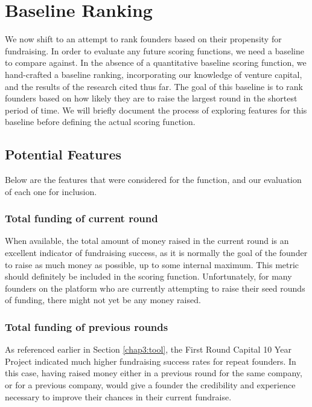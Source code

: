 \section{Baseline Ranking}

We now shift to an attempt to rank founders based on their propensity for fundraising. In order to evaluate any future scoring functions, we need a baseline to compare against. In the absence of a quantitative baseline scoring function, we hand-crafted a baseline ranking, incorporating our knowledge of venture capital, and the results of the research cited thus far. The goal of this baseline is to rank founders based on how likely they are to raise the largest round in the shortest period of time. We will briefly document the process of exploring features for this baseline before defining the actual scoring function.

\subsection{Potential Features}

Below are the features that were considered for the function, and our evaluation of each one for inclusion.

\subsubsection{Total funding of current round}

When available, the total amount of money raised in the current round is an excellent indicator of fundraising success, as it is normally the goal of the founder to raise as much money as possible, up to some internal maximum. This metric should definitely be included in the scoring function. Unfortunately, for many founders on the platform who are currently attempting to raise their seed rounds of funding, there might not yet be any money raised.

\subsubsection{Total funding of previous rounds}

As referenced earlier in Section \ref{chap3:tool}, the First Round Capital 10 Year Project \cite{first-round-10-years} indicated much higher fundraising success rates for repeat founders. In this case, having raised money either in a previous round for the same company, or for a previous company, would give a founder the credibility and experience necessary to improve their chances in their current fundraise.

